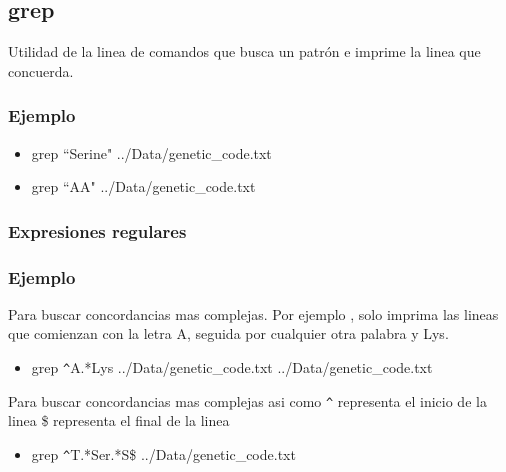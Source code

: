 \documentclass[10pt]{article}
\begin{document}
\subsection{grep}
Utilidad de la linea de comandos que busca un patrón e imprime la linea que concuerda.

\subsubsection{Ejemplo}
\begin{itemize}
\item grep ``Serine" ../Data/genetic\_code.txt
\item grep ``AA" ../Data/genetic\_code.txt
\end{itemize}

\subsubsection{Expresiones regulares}

\subsubsection{Ejemplo}
Para buscar concordancias mas complejas. Por ejemplo , solo imprima las lineas que comienzan con la letra A, seguida por cualquier otra palabra y Lys.
\begin{itemize}
\item grep  \verb"^"A.*Lys   ../Data/genetic\_code.txt ../Data/genetic\_code.txt
\end{itemize}
Para buscar concordancias mas complejas  asi como \verb"^" representa el inicio de la linea \$ representa el final de la linea

\begin{itemize}
\item  grep \verb"^"T.*Ser.*S\$ ../Data/genetic\_code.txt
\end{itemize}
\end{document}
